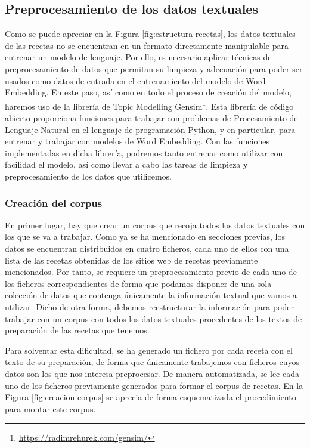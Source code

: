 \subsection{Preprocesamiento de los datos textuales}\label{subsec:preprocessing}

Como se puede apreciar en la Figura \ref{fig:estructura-recetas}, los datos textuales de las recetas no se encuentran en un formato directamente manipulable para entrenar un modelo de lenguaje. Por ello, es necesario aplicar técnicas de preprocesamiento de datos que permitan su limpieza y adecuación para poder ser usados como datos de entrada en el entrenamiento del modelo de Word Embedding. En este paso, así como en todo el proceso de creación del modelo, haremos uso de la librería de Topic Modelling  Gensim\footnote{\url{https://radimrehurek.com/gensim/}}. Esta librería de código abierto proporciona funciones para trabajar con problemas de Procesamiento de Lenguaje Natural en el lenguaje de programación Python, y en particular, para entrenar y trabajar con modelos de Word Embedding. Con las funciones implementadas en dicha librería, podremos tanto entrenar como utilizar con facilidad el modelo, así como llevar a cabo las tareas de limpieza y preprocesamiento de los datos que utilicemos.

\subsubsection{Creación del corpus}

En primer lugar, hay que crear un corpus que recoja todos los datos textuales con los que se va a trabajar. Como ya se ha mencionado en secciones previas, los datos se encuentran distribuidos en cuatro ficheros, cada uno de ellos con una lista de las recetas obtenidas de los sitios web de recetas previamente mencionados. Por tanto, se requiere un preprocesamiento previo de cada uno de los ficheros correspondientes de forma que podamos disponer de una sola colección de datos que contenga únicamente la información textual que vamos a utilizar. Dicho de otra forma, debemos reestructurar la información para poder trabajar con un corpus con todos los datos textuales procedentes de los textos de preparación de las recetas que tenemos. 

Para solventar esta dificultad, se ha generado un fichero por cada receta con el texto de su preparación, de forma que únicamente trabajemos con ficheros cuyos datos son los que nos interesa preprocesar. De manera automatizada, se lee cada uno de los ficheros previamente generados para formar el corpus de recetas. En la Figura \ref{fig:creacion-corpus} se aprecia de forma esquematizada el procedimiento para montar este corpus.

